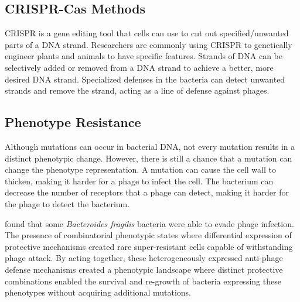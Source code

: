\subsection{CRISPR-Cas Methods}
CRISPR is a gene editing tool that cells can use to cut out specified/unwanted parts of a DNA strand. 
Researchers are commonly using CRISPR to genetically engineer plants and animals to have specific features. 
Strands of DNA can be selectively added or removed from a DNA strand to achieve a better, more desired DNA strand. 
Specialized defenses in the bacteria can detect unwanted strands and remove the strand, acting as a line of defense against phages. 

\subsection{Phenotype Resistance}
Although mutations can occur in bacterial DNA, not every mutation results in a distinct phenotypic change.
However, there is still a chance that a mutation can change the phenotype representation. 
A mutation can cause the cell wall to thicken, making it harder for a phage to infect the cell. 
The bacterium can decrease the number of receptors that a phage can detect, making it harder for the phage to detect the bacterium. 

\citet{guptaCombinatorialPhenotypicLandscape2025} found that some \textit{Bacteroides fragilis} bacteria were able to evade phage infection.  
The presence of combinatorial phenotypic states where differential expression of protective mechanisms created rare super-resistant cells capable of withstanding phage attack.
By acting together, these heterogeneously expressed anti-phage defense mechanisms created a phenotypic landscape where distinct protective combinations enabled the survival and re-growth of bacteria expressing these phenotypes without acquiring additional mutations. 

